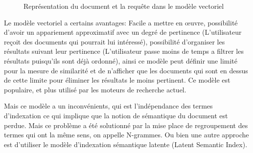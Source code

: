 \begin{figure}[htbp]
    \begin{center}
    \end{center}
    \caption{Représentation du document et la requête dans le modèle vectoriel \citep{model-ir}}
    \label{fig:vector-model}
\end{figure}

Le modèle vectoriel a certains avantages: Facile a mettre en œuvre, possibilité d'avoir un appariement approximatif avec un degré de pertinence (L'utilisateur reçoit des documents qui pourrait lui intéressé), possibilité d'organiser les résultats suivant leur pertinence (L'utilisateur passe moins de temps a filtrer les résultats puisqu'ils sont déjà ordonné), ainsi ce modèle peut définir une limité pour la mesure de similarité et de n'afficher que les documents qui sont en dessus de cette limite pour éliminer les résultats le moins pertinent. Ce modèle est populaire, et plus utilisé par les moteurs de recherche actuel. \citep*{approche-semantique, modern-ir, soulier2014:def-evaluation-modele}

Mais ce modèle a un inconvénients, qui est l’indépendance des termes d'indexation ce qui implique que la notion de sémantique du document est perdue. Mais ce problème a été solutionné par la mise place de regroupement des termes qui ont la même sens, on appelle N-grammes. Ou bien une autre approche est d'utiliser le modèle d’indexation sémantique latente (Latent Semantic Index).

